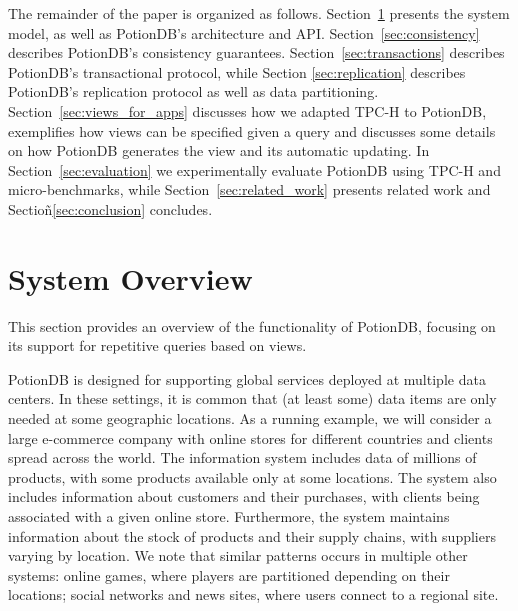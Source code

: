\documentclass[sigplan,10pt]{acmart}
\newcommand{\outline}[1]{}
\begin{document}
The remainder of the paper is organized as follows.
Section~\ref{sec:overview} presents the system model, as well as PotionDB's architecture and API.
Section~\ref{sec:consistency} describes PotionDB's consistency guarantees.
Section~\ref{sec:transactions} describes PotionDB's transactional protocol, while Section \ref{sec:replication} describes PotionDB's replication protocol as well as data partitioning.
Section~\ref{sec:views_for_apps} discusses how we adapted TPC-H to PotionDB, exemplifies how views can be specified given a query and discusses some details on how PotionDB generates the view and its automatic updating.
In Section~\ref{sec:evaluation} we experimentally evaluate PotionDB using TPC-H and micro-benchmarks, while Section~\ref{sec:related_work} presents related work and Sectioñ\ref{sec:conclusion} concludes.


%

\section{System Overview}
\label{sec:overview}

This section provides an overview of the functionality of PotionDB, focusing on its support for 
repetitive queries based on views.

PotionDB is designed for supporting global services deployed at multiple data centers. In these settings,
it is common that (at least some) data items are only needed at some geographic locations. 
As a running example, we will consider a large e-commerce company with online stores for different countries 
and clients spread across the world. 
The information system includes data of millions of products, with some products available only at some locations.
The system also includes information about customers and their purchases, with clients being associated with a given 
online store.
Furthermore, the system maintains information about the stock of products and their supply chains, with suppliers varying by location.
We note that similar patterns occurs in multiple other systems: online games, where players are partitioned depending
on their locations; social networks and news sites, where users connect to a regional site.
\end{document}
